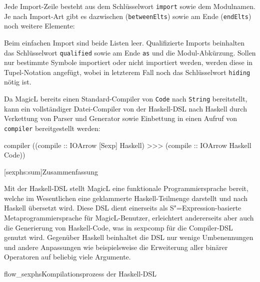 \documentclass[12pt, a4paper, bibgerm]{scrbook}
\newenvironment{DIFnomarkup}{}{}
\newcommand\icode[1]{\lstinline?#1?}
\newcommand\lsection{}
\newcommand\cref{}
\newcommand\fig{}
\newcommand{\sexp}{S"=Expression}
\begin{document}
Jede Import-Zeile besteht aus dem Schlüsselwort \icode{import} sowie
dem Modulnamen. Je nach Import-Art gibt es dazwischen
(\icode{betweenElts}) sowie am Ende (\icode{endElts}) noch
weitere Elemente:
\begin{DIFnomarkup}\end{DIFnomarkup}%
Beim einfachen Import sind beide Listen leer. Qualifizierte Imports
beinhalten das Schlüsselwort \icode{qualified} sowie am Ende
\icode{as} und die Modul-Abkürzung. Sollen nur bestimmte Symbole
importiert oder nicht importiert werden, werden diese in
Tupel-Notation angefügt, wobei in letzterem Fall noch das
Schlüsselwort \icode{hiding} nötig ist.

Da MagicL bereits einen Standard-Compiler von \icode{Code} nach
\icode{String} bereitstellt, kann ein vollständiger Datei-Compiler von
der Haskell-DSL nach Haskell durch Verkettung von Parser
und Generator sowie Einbettung in einen Aufruf von \icode{compiler}
bereitgestellt werden:
\begin{DIFnomarkup}\begin{code}
compiler ((compile :: IOArrow [Sexp] Haskell) >>> 
          (compile :: IOArrow Haskell Code))  
\end{code}\end{DIFnomarkup}

\lsection[sexphs:sum]{Zusammenfassung}

Mit der Haskell-DSL stellt MagicL eine funktionale Programmiersprache
bereit, welche im Wesentlichen eine geklammerte Haskell-Teilmenge
darstellt und nach Haskell übersetzt wird. Diese DSL dient einerseits
als \sexp{}-basierte Metaprogrammiersprache für MagicL-Benutzer,
erleichtert andererseits aber auch die Generierung von Haskell-Code, was
in \cref{sexpcomp} für die Compiler-DSL genutzt wird. Gegenüber Haskell
beinhaltet die DSL nur wenige Umbenennungen und andere Anpassungen wie
beispielsweise die Erweiterung aller binärer Operatoren auf beliebig
viele Argumente.

\fig{flow_sexphs}{Kompilationsprozess der Haskell-DSL}
\end{document}

